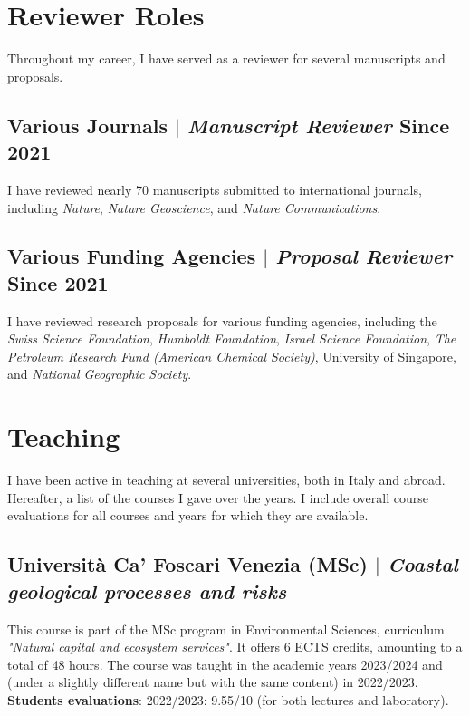 \documentclass[11pt]{article}
\begin{document}
\section{Reviewer Roles}
{\normalfont Throughout my career, I have served as a reviewer for several manuscripts and proposals.}\\

\bigskip

\subsection{Various Journals $|$ {\normalfont\textit{Manuscript Reviewer}} \hfill Since 2021}
{\footnotesize I have reviewed nearly 70 manuscripts submitted to international journals, including \textit{Nature}, \textit{Nature Geoscience}, and \textit{Nature Communications}.}
\bigskip

\subsection{Various Funding Agencies $|$ {\normalfont\textit{Proposal Reviewer}} \hfill Since 2021}
{\footnotesize I have reviewed research proposals for various funding agencies, including the \textit{Swiss Science Foundation}, \textit{Humboldt Foundation}, \textit{Israel Science Foundation}, \textit{The Petroleum Research Fund (American Chemical Society)}, University of Singapore, and \textit{National Geographic Society}.}

\newpage

\section{Teaching}
{\normalfont I have been active in teaching at several universities, both in Italy and abroad. Hereafter, a list of the courses I gave over the years. I include overall course evaluations for all courses and years for which they are available.}\\

\bigskip
\subsection{Università Ca' Foscari Venezia (MSc) $|$ {\normalfont\textit{Coastal geological processes and risks}}}
{\footnotesize This course is part of the MSc program in Environmental Sciences, curriculum \textit{"Natural capital and ecosystem services"}. It offers 6 ECTS credits, amounting to a total of 48 hours. The course was taught in the academic years 2023/2024 and (under a slightly different name but with the same content) in 2022/2023.\\
\textbf{Students evaluations}: 2022/2023: 9.55/10 (for both lectures and laboratory).}
\bigskip
\end{document}
